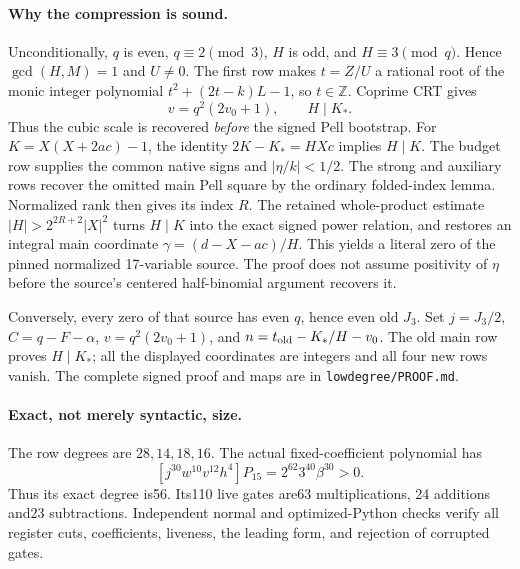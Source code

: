 \paragraph{Why the compression is sound.}
Unconditionally, $q$ is even, $q\equiv2\pmod3$, $H$ is odd, and
$H\equiv3\pmod q$.  Hence $\gcd(H,M)=1$ and $U\ne0$.
The first row makes $t=Z/U$ a rational root of the monic integer polynomial
$t^2+(2t-k)L-1$, so $t\in\mathbb Z$.  Coprime CRT gives
\[
 v=q^2(2v_0+1),\qquad H\mid K_*.
\]
Thus the cubic scale is recovered \emph{before} the signed Pell bootstrap.
For $K=X(X+2ac)-1$, the identity $2K-K_*=HXc$ implies $H\mid K$.
The budget row supplies the common native signs and $|\eta/k|<1/2$.
The strong and auxiliary rows recover the omitted main Pell square by the
ordinary folded-index lemma.  Normalized rank then gives its index $R$.
The retained whole-product estimate
$|H|>2^{2R+2}|X|^2$ turns $H\mid K$ into the exact signed power relation,
and restores an integral main coordinate
$\gamma=(d-X-ac)/H$.  This yields a literal zero of the pinned normalized
17-variable source.  The proof does not assume positivity of $\eta$ before
the source's centered half-binomial argument recovers it.

Conversely, every zero of that source has even $q$, hence even old $J_3$.
Set $j=J_3/2$, $C=q-F-\alpha$, $v=q^2(2v_0+1)$, and
$n=t_{\rm old}-K_*/H-v_0$.  The old main row proves $H\mid K_*$;
all the displayed coordinates are integers and all four new rows vanish.
The complete signed proof and maps are in \texttt{lowdegree/PROOF.md}.

\paragraph{Exact, not merely syntactic, size.}
The row degrees are $28,14,18,16$.  The actual fixed-coefficient polynomial has
\[
 [j^{30}w^{10}v^{12}h^4]P_{15}=2^{62}3^{40}\beta^{30}>0.
\]
Thus its exact degree is56.  Its110 live gates are63 multiplications,
24 additions and23 subtractions.  Independent normal and optimized-Python
checks verify all register cuts, coefficients, liveness, the leading form,
and rejection of corrupted gates.

